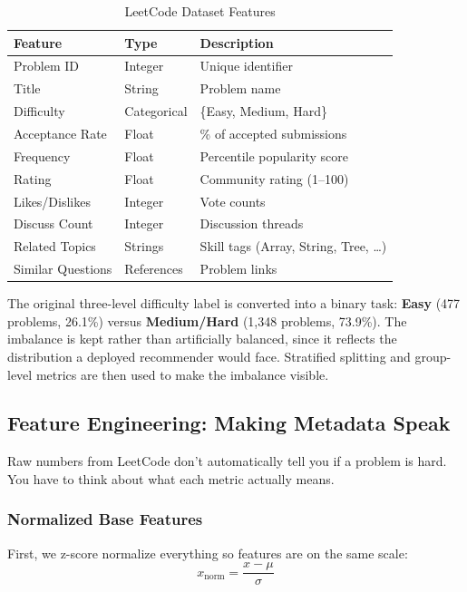 \documentclass[conference]{IEEEtran}
\begin{document}
\begin{table}[h]
\centering
\small
\begin{tabular}{l|l|l}
\toprule
\textbf{Feature} & \textbf{Type} & \textbf{Description} \\
\midrule
Problem ID & Integer & Unique identifier \\
Title & String & Problem name \\
Difficulty & Categorical & \{Easy, Medium, Hard\} \\
Acceptance Rate & Float & \% of accepted submissions \\
Frequency & Float & Percentile popularity score \\
Rating & Float & Community rating (1--100) \\
Likes/Dislikes & Integer & Vote counts \\
Discuss Count & Integer & Discussion threads \\
Related Topics & Strings & Skill tags (Array, String, Tree, \ldots) \\
Similar Questions & References & Problem links \\
\bottomrule
\end{tabular}
\caption{LeetCode Dataset Features}
\label{tab:dataset}
\end{table}

The original three-level difficulty label is converted into a binary task: \textbf{Easy} (477 problems, 26.1\%) versus \textbf{Medium/Hard} (1,348 problems, 73.9\%). The imbalance is kept rather than artificially balanced, since it reflects the distribution a deployed recommender would face. Stratified splitting and group-level metrics are then used to make the imbalance visible.

\subsection{Feature Engineering: Making Metadata Speak}

Raw numbers from LeetCode don't automatically tell you if a problem is hard. You have to think about what each metric actually means.

\subsubsection{Normalized Base Features}

First, we z-score normalize everything so features are on the same scale:
\begin{equation}
x_{\text{norm}} = \frac{x - \mu}{\sigma}
\end{equation}
\end{document}
